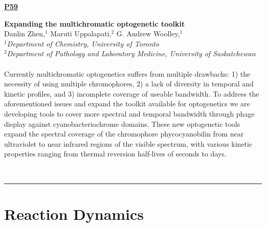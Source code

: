 \documentclass[titlepage,oneside,openany,10pt]{book}
\newenvironment{posterabs}[4] %
        {
	\begin{flushright}
                \underline{\textbf{#4}}
        \end{flushright}
        \textbf{#1}\\%
        #2\\%
        \textit{#3}\\\\%
        }
        {
        \\
        \noindent\rule{15cm}{0.5pt}%
        }
\begin{document}
\vspace{1cm}

\begin{posterabs}
    {Expanding the multichromatic optogenetic toolkit}
    {Danlin Zhen,$^{1}$ Maruti Uppalapati,$^{2}$ G. Andrew Woolley,$^{1}$}
    {
    $^1$Department of Chemistry, University of Toronto\\
    $^2$Department of Pathology and Laboratory Medicine, University of Saskatchewan
    }
    {P59}
    Currently multichromatic optogenetics suffers from multiple drawbacks: 1) the necessity of using multiple chromophores, 2) a lack of diversity in temporal and kinetic profiles, and 3) incomplete coverage of useable bandwidth. To address the aforementioned issues and expand the toolkit available for optogenetics we are developing tools to cover more spectral and temporal bandwidth through phage display against cyanobacteriochrome domains. These new optogenetic tools expand the spectral coverage of the chromophore phycocyanobilin from near ultraviolet to near infrared regions of the visible spectrum, with various kinetic properties ranging from thermal reversion half-lives of seconds to days.
    \label{ZhenD}
\end{posterabs}
\newpage

\section*{Reaction Dynamics}
\label{sec:reactdyn}
\end{document}

